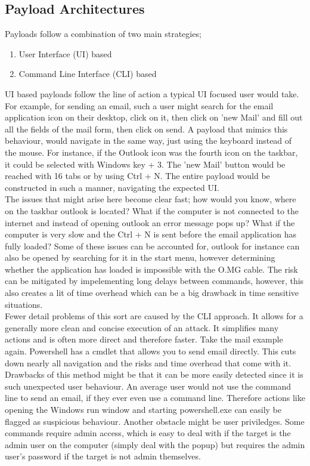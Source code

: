 \subsection{Payload Architectures}

Payloads follow a combination of two main strategies; 
\begin{enumerate}
    \item User Interface (UI) based
    \item Command Line Interface (CLI) based
\end{enumerate}

UI based payloads follow the line of action a typical UI focused user would take. For example, for sending an email, such a user might search for the email application icon on their desktop, click on it, then click on 'new Mail' and fill out all the fields of the mail form, then click on send. A payload that mimics this behaviour, would navigate in the same way, just using the keyboard instead of the mouse. For instance, if the Outlook icon was the fourth icon on the taskbar, it could be selected with Windows key + 3. The 'new Mail' button would be reached with 16 tabs or by using  Ctrl + N. The entire payload would be constructed in such a manner, navigating the expected UI. \\
The issues that might arise here become clear fast; how would you know, where on the taskbar outlook is located? What if the computer is not connected to the internet and instead of opening outlook an error message pops up? What if the computer is very slow and the Ctrl + N is sent before the email application has fully loaded?  Some of these issues can be accounted for, outlook for instance can also be opened by searching for it in the start menu, however determining whether the application has loaded is impossible with the O.MG cable. The risk can be mitigated by impelementing long delays between commands, however, this also creates a lit of time overhead which can be a big drawback in time sensitive situations. \\

Fewer detail problems of this sort are caused by the CLI approach. It allows for a generally more clean and concise execution of an attack. It simplifies many actions and is often more direct and therefore faster. Take the mail example again. Powershell has a cmdlet that allows you to send email directly. This cuts down nearly all navigation and the risks and time overhead that come with it. \\
Drawbacks of this method might be that it can be more easily detected since it is such unexpected user behaviour. An average user would not use the command line to send an email, if they ever even use a command line. Therefore actions like opening the Windows run window and starting powershell.exe can easily be flagged as suspicious behaviour. Another obstacle might be user priviledges. Some commands require admin access, which is easy to deal with if the target is the admin user on the computer (simply deal with the popup) but requires the admin user's password if the target is not admin themselves. 


